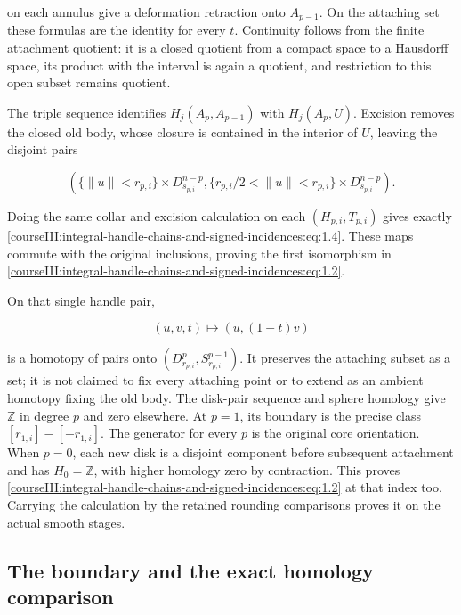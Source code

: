on each annulus give a deformation retraction onto \(A_{p-1}\). On the attaching set these formulas are the identity for every \(t\). Continuity follows from the finite attachment quotient: it is a closed quotient from a compact space to a Hausdorff space, its product with the interval is again a quotient, and restriction to this open subset remains quotient.

The triple sequence identifies \(H_j(A_p,A_{p-1})\) with \(H_j(A_p,U)\). Excision removes the closed old body, whose closure is contained in the interior of \(U\), leaving the disjoint pairs

\begin{equation}
\left(
 \{\|u\|<r_{p,i}\}\times D^{n-p}_{s_{p,i}},
 \{r_{p,i}/2<\|u\|<r_{p,i}\}\times D^{n-p}_{s_{p,i}}
 \right).
 \label{courseIII:integral-handle-chains-and-signed-incidences:eq:1.4}
\end{equation}

Doing the same collar and excision calculation on each \((H_{p,i},T_{p,i})\) gives exactly \eqref{courseIII:integral-handle-chains-and-signed-incidences:eq:1.4}. These maps commute with the original inclusions, proving the first isomorphism in \eqref{courseIII:integral-handle-chains-and-signed-incidences:eq:1.2}.

On that single handle pair,

\begin{equation}
(u,v,t)\longmapsto(u,(1-t)v)
 \label{courseIII:integral-handle-chains-and-signed-incidences:eq:1.5}
\end{equation}

is a homotopy of pairs onto \((D^p_{r_{p,i}},S^{p-1}_{r_{p,i}})\). It preserves the attaching subset as a set; it is not claimed to fix every attaching point or to extend as an ambient homotopy fixing the old body. The disk-pair sequence and sphere homology give \(\mathbb Z\) in degree \(p\) and zero elsewhere. At \(p=1\), its boundary is the precise class \([r_{1,i}]-[-r_{1,i}]\). The generator for every \(p\) is the original core orientation. When \(p=0\), each new disk is a disjoint component before subsequent attachment and has \(H_0=\mathbb Z\), with higher homology zero by contraction. This proves \eqref{courseIII:integral-handle-chains-and-signed-incidences:eq:1.2} at that index too. Carrying the calculation by the retained rounding comparisons proves it on the actual smooth stages.

\subsection{The boundary and the exact homology comparison}
\label{courseIII:integral-handle-chains-and-signed-incidences:handle-chain-boundary}


